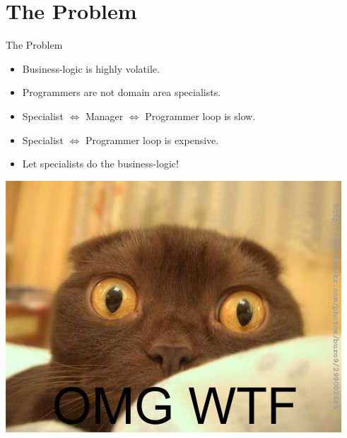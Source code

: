 \documentclass[handout]{beamer}
\begin{document}

\section{The Problem}


\begin{frame}{The Problem}

\begin{itemize}
\item Business-logic is highly volatile.
\item Programmers are not domain area specialists.
\item Specialist $\Leftrightarrow$ Manager $\Leftrightarrow$ Programmer
loop is slow.
\item Specialist $\Leftrightarrow$ Programmer loop is expensive.
\item Let specialists do the business-logic!
\end{itemize}

\end{frame}


\begin{frame}

\includegraphics[height=.8\textheight]{omgwtf}

\end{frame}

\end{document}
